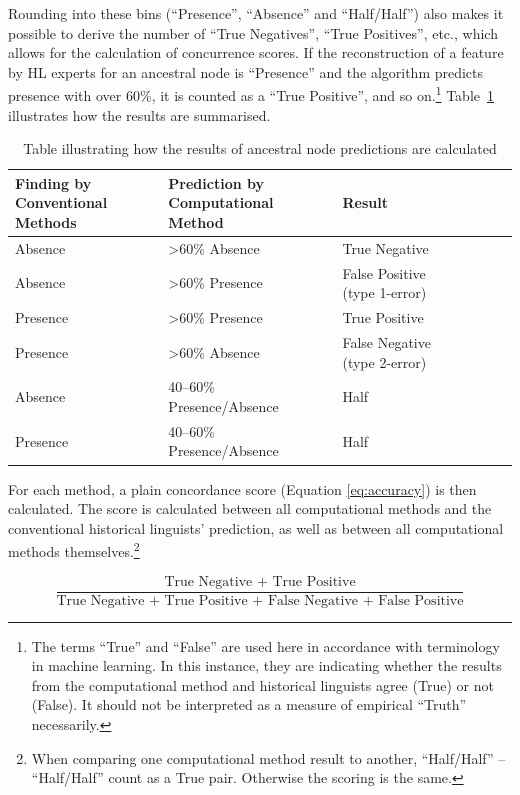 \documentclass[12pt,letterpaper]{article}
\begin{document}
Rounding into these bins (``Presence'', ``Absence'' and ``Half/Half'') also makes it possible to derive the number of ``True Negatives'', ``True Positives'', etc., which allows for the calculation of concurrence scores. If the reconstruction of a feature by HL experts for an ancestral node is ``Presence'' and the algorithm predicts presence with over 60\%, it is counted as a ``True Positive'', and so on.\footnote{The terms ``True'' and ``False'' are used here in accordance with terminology in machine learning. In this instance, they are indicating whether the results from the computational method and historical linguists agree (True) or not (False). It should not be interpreted as a measure of empirical ``Truth'' necessarily.} Table~\ref{example_HL_prediction_table_true_positives} illustrates how the results are summarised.

\begin{table}[ht]
\centering
\caption{Table illustrating how the results of ancestral node predictions are calculated}
\label{example_HL_prediction_table_true_positives}
\begin{tabular}{|p{3cm}|p{5cm}|p{5.5cm}|l|l|l|l|l|}
\hline
\textbf{Finding by Conventional Methods} & \textbf{Prediction by Computational Method} & \textbf{Result} \\ \hline
Absence & >60\% Absence & True Negative \\ \hline
Absence & >60\% Presence & False Positive (type 1-error) \\ \hline
Presence & >60\% Presence & True Positive \\ \hline
Presence & >60\% Absence & False Negative (type 2-error) \\ \hline
Absence & 40--60\% Presence/Absence & Half \\ \hline
Presence & 40--60\% Presence/Absence & Half\\ \hline
\end{tabular}
\end{table}

For each method, a plain concordance score (Equation \eqref{eq:accuracy}) is then calculated. The score is calculated between all computational methods and the conventional historical linguists' prediction, as well as between all computational methods themselves.\footnote{When comparing one computational method result to another, ``Half/Half'' -- ``Half/Half'' count as a True pair. Otherwise the scoring is the same.}

\begin{equation}\label{eq:accuracy}
\frac{\text{True Negative + True Positive}}{\text{True Negative + True Positive + False Negative + False Positive}}
\end{equation}
\end{document}
